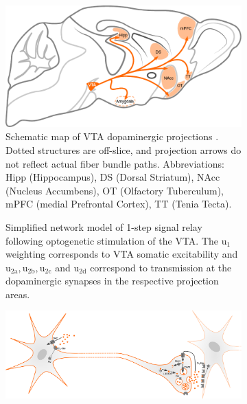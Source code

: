 \begin{sansmath}
\begin{figure}[h!]
	\centering
	\hspace*{\fill}
	\begin{subfigure}{.527\textwidth}
		\centering
		\vspace{-1em}
		\includegraphics[width=\textwidth]{img/model_literature}
		\caption{
			Schematic map of VTA dopaminergic projections \cite{Aransay2015,Fields2007,Ikemoto2007,Hnasko2012,Pan2010}.
			Dotted structures are off-slice, and projection arrows do not reflect actual fiber bundle paths.
			Abbreviations: Hipp (Hippocampus), DS (Dorsal Striatum), NAcc (Nucleus Accumbens), OT (Olfactory Tuberculum), mPFC (medial Prefrontal Cortex), TT (Tenia Tecta).
			}
		\label{fig:ml}
	\end{subfigure}\hfill
	\begin{subfigure}{.44\textwidth}
		\centering
		\vspace{-2em}
		\vspace{-2em}
		\caption{
			Simplified network model of 1-step signal relay following optogenetic stimulation of the VTA.
			The $\mathrm{u_1}$ weighting corresponds to VTA somatic excitability and $\mathrm{u_{2a},u_{2b},u_{2c}}$ and $\mathrm{u_{2d}}$ correspond to transmission at the dopaminergic synapses in the respective projection areas.
			}
		\label{fig:nm}
	\end{subfigure}
	\hspace*{\fill}
	\begin{subfigure}{.985\textwidth}
		\centering
		\vspace{.5em}
		\includegraphics[width=\textwidth]{img/da}

\end{subfigure}
\end{figure}
\end{sansmath}

